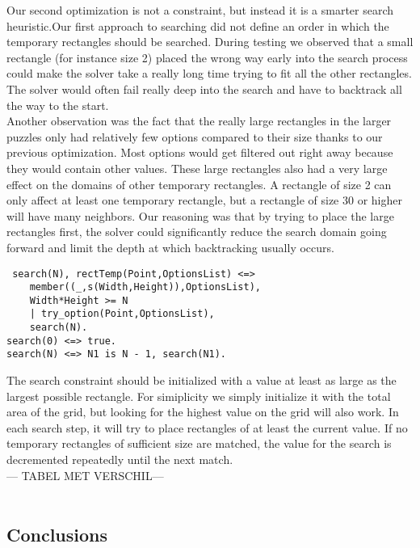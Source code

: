 Our second optimization is not a constraint, but instead it is a smarter search heuristic.Our first approach to searching did not define an order in which the temporary rectangles should be searched. During testing we observed that a small rectangle (for instance size 2) placed the wrong way early into the search process could make the solver take a really long time trying to fit all the other rectangles. The solver would often fail really deep into the search and have to backtrack all the way to the start. \\
 Another observation was the fact that the really large rectangles in the larger puzzles only had relatively few options compared to their size thanks to our previous optimization. Most options would get filtered out right away because they would contain other values. These large rectangles also had a very large effect on the domains of other temporary rectangles. A rectangle of size 2 can only affect at least one temporary rectangle, but a rectangle of size 30 or higher will have many neighbors. Our reasoning was that by trying to place the large rectangles first, the solver could significantly reduce the search domain going forward and limit the depth at which backtracking usually occurs.
 \begin{lstlisting}
 search(N), rectTemp(Point,OptionsList) <=>
	member((_,s(Width,Height)),OptionsList),
	Width*Height >= N
	| try_option(Point,OptionsList),
	search(N).
search(0) <=> true.
search(N) <=> N1 is N - 1, search(N1).
\end{lstlisting}
The search constraint should be initialized with a value at least as large as the largest possible rectangle. For simiplicity we simply initialize it with the total area of the grid, but looking for the highest value on the grid will also work. In each search step, it will try to place rectangles of at least the current value. If no temporary rectangles of sufficient size are matched, the value for the search is decremented repeatedly until the next match. \\

--- TABEL MET VERSCHIL--- \\ \\
\subsection{Conclusions}


